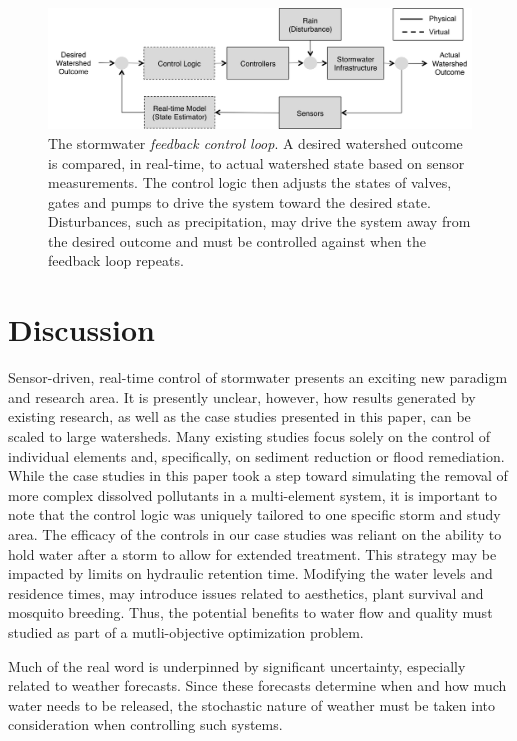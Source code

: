 \begin{figure}
\centering
\includegraphics[width=.9\textwidth]{gfx/Chapter-1/arch.png}
  \caption{The stormwater \textit{feedback control loop}. A desired watershed outcome is compared, in real-time, to actual watershed state based on sensor measurements. The control logic then adjusts the states of valves, gates and pumps to drive the system toward the desired state. Disturbances, such as precipitation, may drive the system away from the desired outcome and must be controlled against when the feedback loop repeats.}
\label{fgr:rsch_gaps}
\end{figure}

\section{Discussion}
Sensor-driven, real-time control of stormwater presents an exciting new paradigm and research area. It is presently unclear, however, how results generated by existing research, as well as the case studies presented in this paper, can be scaled to large watersheds. 
Many existing studies focus solely on the control of individual elements and, specifically, on sediment reduction or flood remediation. 
While the case studies in this paper took a step toward simulating the removal of more complex dissolved pollutants in a multi-element system, it is important to note that the control logic was uniquely  tailored to one specific storm and study area. 
The efficacy of the controls in our case studies was reliant on the ability to hold water after a storm to allow for extended treatment. 
This strategy may be impacted by limits on hydraulic retention time.
Modifying the water levels and residence times, may introduce issues related to aesthetics, plant survival and mosquito breeding\cite{Knight2003211}. Thus, the potential benefits to water flow and quality must studied as part of a mutli-objective optimization problem.

Much of the real word is underpinned by significant uncertainty, especially related to weather forecasts. 
Since these forecasts determine when and how much water needs to be released, the stochastic nature of weather must be taken into consideration when controlling such systems. 

